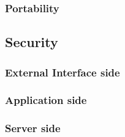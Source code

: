 \subsubsection{Portability}

\subsection{Security}

\subsubsection{External Interface side}

\subsubsection{Application side}

\subsubsection{Server side}